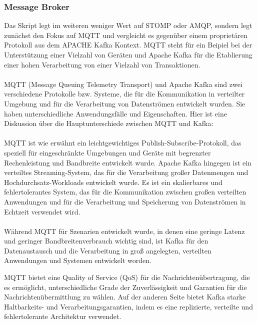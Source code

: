 \subsubsection{Message Broker}
Das Skript legt im weiteren weniger Wert auf STOMP oder AMQP, sondern legt zunächst den Fokus auf MQTT und vergleicht es gegenüber einem proprietären Protokoll aus dem APACHE Kafka Kontext. MQTT steht für ein Beipiel bei der Unterstützung einer Vielzahl von Geräten und Apache Kafka für die Etablierung einer hohen Verarbeitung von einer Vielzahl von Transaktionen.
\\\\
MQTT (Message Queuing Telemetry Transport) und Apache Kafka sind zwei verschiedene Protokolle bzw. Systeme, die für die Kommunikation in verteilter Umgebung und für die Verarbeitung von Datenströmen entwickelt wurden. Sie haben unterschiedliche Anwendungsfälle und Eigenschaften. Hier ist eine Diskussion über die Hauptunterschiede zwischen MQTT und Kafka:
\\\\
MQTT ist wie erwähnt ein leichtgewichtiges Publish-Subscribe-Protokoll, das speziell für eingeschränkte Umgebungen und Geräte mit begrenzter Rechenleistung und Bandbreite entwickelt wurde. Apache Kafka hingegen ist ein verteiltes Streaming-System, das für die Verarbeitung großer Datenmengen und Hochdurchsatz-Workloads entwickelt wurde. Es ist ein skalierbares und fehlertolerantes System, das für die Kommunikation zwischen großen verteilten Anwendungen und für die Verarbeitung und Speicherung von Datenströmen in Echtzeit verwendet wird.
\\\\
Während MQTT für Szenarien entwickelt wurde, in denen eine geringe Latenz und geringer Bandbreitenverbrauch wichtig sind, ist Kafka für den Datenaustausch und die Verarbeitung in groß angelegten, verteilten Anwendungen und Systemen entwickelt worden.

MQTT bietet eine Quality of Service (QoS) für die Nachrichtenübertragung, die es ermöglicht, unterschiedliche Grade der Zuverlässigkeit und Garantien für die Nachrichtenübermittlung zu wählen. Auf der anderen Seite bietet Kafka starke Haltbarkeits- und Verarbeitungsgarantien, indem es eine replizierte, verteilte und fehlertolerante Architektur verwendet.
